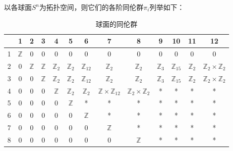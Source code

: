 

以各球面$S^n$为拓扑空间，则它们的各阶同伦群$\pi_i$列举如下：

\begin{table}[ht]
\centering
\caption{球面的同伦群}\label{SphHmt_tab1}
\begin{tabular}{|c|c|c|c|c|c|c|c|c|c|c|c|c|}
\hline
 & 1 & 2 & 3 & 4 & 5 & 6 & 7 & 8 & 9 & 10 & 11 & 12 \\
\hline
1 & $\mathbb{Z}$ & 0 & 0 & 0 & 0 & 0 & 0 & 0 & 0 & 0 & 0 & 0 \\
\hline
2 & 0 & $\mathbb{Z}$ & $\mathbb{Z}$ & $\mathbb{Z}_2$ & $\mathbb{Z}_2$ & $\mathbb{Z}_{12}$ & $\mathbb{Z}_2$ & $\mathbb{Z}_2$ & $\mathbb{Z}_3$ & $\mathbb{Z}_{15}$ & $\mathbb{Z}_2$ & $\mathbb{Z}_2\times\mathbb{Z}_2$\\
\hline
3 & 0 & 0 & $\mathbb{Z}$ & $\mathbb{Z}_2$ & $\mathbb{Z}_2$ & $\mathbb{Z}_{12}$ & $\mathbb{Z}_2$ & $\mathbb{Z}_2$ & $\mathbb{Z}_3$ & $\mathbb{Z}_{15}$ & $\mathbb{Z}_2$ & $\mathbb{Z}_2\times\mathbb{Z}_2$ \\
\hline
4 & 0 & 0 & 0 & $\mathbb{Z}$ & $\mathbb{Z}_2$ & $\mathbb{Z}_2$ & $\mathbb{Z}\times\mathbb{Z}_{12}$ & $\mathbb{Z}_2\times\mathbb{Z}_2$ & * & * & * & * \\
\hline
5 & 0 & 0 & 0 & 0 & $\mathbb{Z}$ & * & * & * & * & * & * & * \\
\hline
6 & 0 & 0 & 0 & 0 & 0 & $\mathbb{Z}$ & * & * & * & * & * & * \\
\hline
7 & 0 & 0 & 0 & 0 & 0 & 0 & $\mathbb{Z}$ & * & * & * & * & * \\
\hline
8 & 0 & 0 & 0 & 0 & 0 & 0 & 0 & $\mathbb{Z}$ & * & * & * & * \\
\hline
\end{tabular}
\end{table}